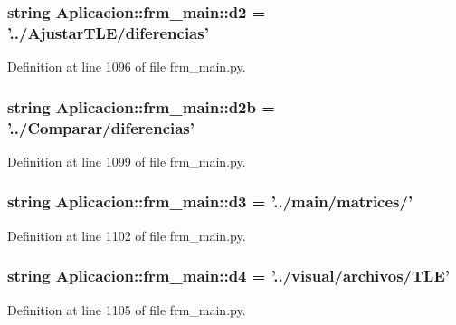 \subsubsection[{d2}]{\setlength{\rightskip}{0pt plus 5cm}string {\bf \-Aplicacion\-::frm\-\_\-main\-::d2} = '../\-Ajustar\-T\-L\-E/diferencias'}\label{namespace_aplicacion_1_1frm__main_a5b795ba5921a46666c1e779b05cdf3ee}


\-Definition at line 1096 of file frm\-\_\-main.\-py.

\subsubsection[{d2b}]{\setlength{\rightskip}{0pt plus 5cm}string {\bf \-Aplicacion\-::frm\-\_\-main\-::d2b} = '../\-Comparar/diferencias'}\label{namespace_aplicacion_1_1frm__main_acb7b8e20c51ef31840addd2e2be958da}


\-Definition at line 1099 of file frm\-\_\-main.\-py.

\subsubsection[{d3}]{\setlength{\rightskip}{0pt plus 5cm}string {\bf \-Aplicacion\-::frm\-\_\-main\-::d3} = '../main/matrices/'}\label{namespace_aplicacion_1_1frm__main_a4c4a18684da308be545ba0446c9df47e}


\-Definition at line 1102 of file frm\-\_\-main.\-py.

\subsubsection[{d4}]{\setlength{\rightskip}{0pt plus 5cm}string {\bf \-Aplicacion\-::frm\-\_\-main\-::d4} = '../visual/archivos/\-T\-L\-E'}\label{namespace_aplicacion_1_1frm__main_a46e1aa80ab023f60c5e61deac06222f5}


\-Definition at line 1105 of file frm\-\_\-main.\-py.

